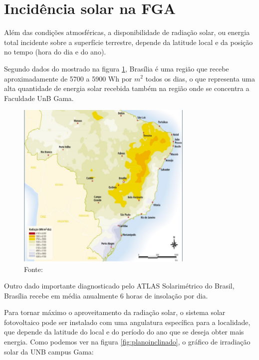 \section{Incidência solar na FGA}

Além das condições atmosféricas, a disponibilidade de radiação solar, ou energia total incidente sobre a superfície terrestre, depende da latitude local e da posição no tempo (hora do dia e do ano). 

Segundo dados do \cite{colle1998atlas} mostrado na figura \ref{fig:atlas}, Brasília é uma região que recebe aproximadamente de 5700 a 5900 Wh por $m^{2}$ todos os dias, o que representa uma alta quantidade de energia solar recebida também na região onde se concentra a Faculdade UnB Gama. 

\begin{figure}[!h]
\centering
\includegraphics[width=0.75\textwidth]{figuras/atlas.png}
\caption{Fonte: \cite{colle1998atlas}}
\label{fig:atlas}
\end{figure}

Outro dado importante diagnosticado pelo ATLAS Solarimétrico do Brasil, Brasília recebe em média anualmente 6 horas de insolação por dia. 

Para tornar máximo o aproveitamento da radiação solar, o sistema solar fotovoltaico pode ser instalado com uma angulatura específica para a localidade, que depende da latitude do local e do período do ano que se deseja obter mais energia. Como podemos ver na figura \ref{fig:planoinclinado}, o gráfico de irradiação solar da UNB campus Gama:

